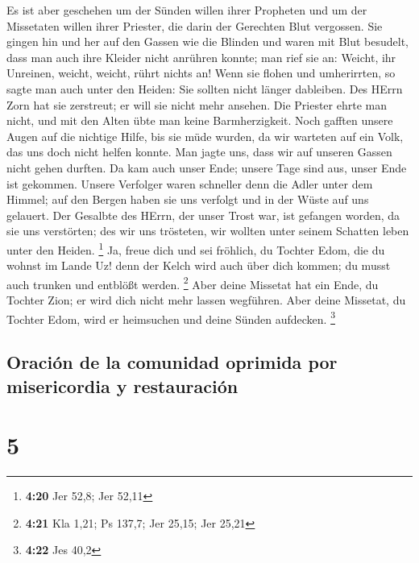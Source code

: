  Es ist aber geschehen um der Sünden willen ihrer
Propheten und um der Missetaten willen ihrer Priester, die darin der
Gerechten Blut vergossen.  Sie gingen hin und her auf den
Gassen wie die Blinden und waren mit Blut besudelt, dass man auch ihre
Kleider nicht anrühren konnte;  man rief sie an: Weicht,
ihr Unreinen, weicht, weicht, rührt nichts an! Wenn sie flohen und
umherirrten, so sagte man auch unter den Heiden: Sie sollten nicht
länger dableiben.  Des HErrn Zorn hat sie zerstreut; er
will sie nicht mehr ansehen. Die Priester ehrte man nicht, und mit den
Alten übte man keine Barmherzigkeit.  Noch gafften unsere
Augen auf die nichtige Hilfe, bis sie müde wurden, da wir warteten auf
ein Volk, das uns doch nicht helfen konnte.  Man jagte
uns, dass wir auf unseren Gassen nicht gehen durften. Da kam auch unser
Ende; unsere Tage sind aus, unser Ende ist gekommen. 
Unsere Verfolger waren schneller denn die Adler unter dem Himmel; auf
den Bergen haben sie uns verfolgt und in der Wüste auf uns gelauert.
 Der Gesalbte des HErrn, der unser Trost war, ist
gefangen worden, da sie uns verstörten; des wir uns trösteten, wir
wollten unter seinem Schatten leben unter den Heiden. \footnote{\textbf{4:20}
  Jer 52,8; Jer 52,11}  Ja, freue dich und sei fröhlich,
du Tochter Edom, die du wohnst im Lande Uz! denn der Kelch wird auch
über dich kommen; du musst auch trunken und entblößt werden. \footnote{\textbf{4:21}
  Kla 1,21; Ps 137,7; Jer 25,15; Jer 25,21}  Aber deine
Missetat hat ein Ende, du Tochter Zion; er wird dich nicht mehr lassen
wegführen. Aber deine Missetat, du Tochter Edom, wird er heimsuchen und
deine Sünden aufdecken. \footnote{\textbf{4:22} Jes 40,2}

\hypertarget{oraciuxf3n-de-la-comunidad-oprimida-por-misericordia-y-restauraciuxf3n}{%
\subsection{Oración de la comunidad oprimida por misericordia y
restauración}\label{oraciuxf3n-de-la-comunidad-oprimida-por-misericordia-y-restauraciuxf3n}}

\hypertarget{section-4}{%
\section{5}\label{section-4}}

